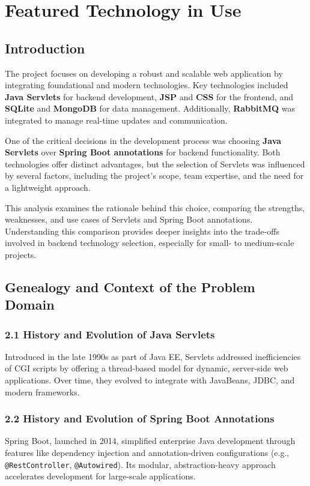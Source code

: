 \section{Featured Technology in Use}
\label{featured_technology}

\subsection{Introduction}

The project focuses on developing a robust and scalable web application by integrating foundational and modern technologies. Key technologies included \textbf{Java Servlets} for backend development, \textbf{JSP} and \textbf{CSS} for the frontend, and \textbf{SQLite} and \textbf{MongoDB} for data management. Additionally, \textbf{RabbitMQ} was integrated to manage real-time updates and communication.

One of the critical decisions in the development process was choosing \textbf{Java Servlets} over \textbf{Spring Boot annotations} for backend functionality. Both technologies offer distinct advantages, but the selection of Servlets was influenced by several factors, including the project’s scope, team expertise, and the need for a lightweight approach.

This analysis examines the rationale behind this choice, comparing the strengths, weaknesses, and use cases of Servlets and Spring Boot annotations. Understanding this comparison provides deeper insights into the trade-offs involved in backend technology selection, especially for small- to medium-scale projects.

\subsection{Genealogy and Context of the Problem Domain}

\subsubsection{2.1 History and Evolution of Java Servlets}
Introduced in the late 1990s as part of Java EE, Servlets addressed inefficiencies of CGI scripts by offering a thread-based model for dynamic, server-side web applications. Over time, they evolved to integrate with JavaBeans, JDBC, and modern frameworks.

\subsubsection{2.2 History and Evolution of Spring Boot Annotations}
Spring Boot, launched in 2014, simplified enterprise Java development through features like dependency injection and annotation-driven configurations (e.g., \texttt{@RestController}, \texttt{@Autowired}). Its modular, abstraction-heavy approach accelerates development for large-scale applications.

